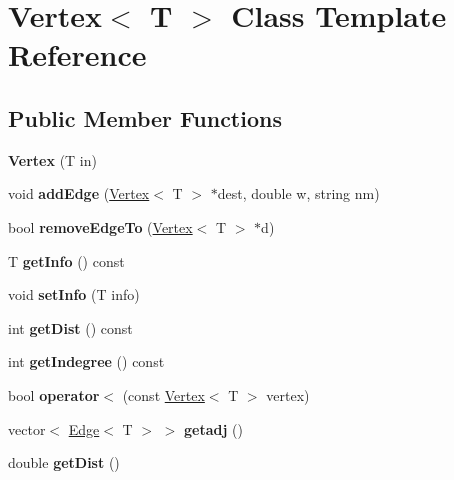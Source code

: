 \hypertarget{class_vertex}{}\section{Vertex$<$ T $>$ Class Template Reference}
\label{class_vertex}
\subsection*{Public Member Functions}
\begin{DoxyCompactItemize}
\item 
\hypertarget{class_vertex_afcbdd4d4198b672356559cb8fa088408}{}\label{class_vertex_afcbdd4d4198b672356559cb8fa088408} 
{\bfseries Vertex} (T in)
\item 
\hypertarget{class_vertex_a2326b28f791a6fd84e32672d75a73ab3}{}\label{class_vertex_a2326b28f791a6fd84e32672d75a73ab3} 
void {\bfseries add\+Edge} (\hyperlink{class_vertex}{Vertex}$<$ T $>$ $\ast$dest, double w, string nm)
\item 
\hypertarget{class_vertex_ab2b5b43fb1709a901b78718436763a84}{}\label{class_vertex_ab2b5b43fb1709a901b78718436763a84} 
bool {\bfseries remove\+Edge\+To} (\hyperlink{class_vertex}{Vertex}$<$ T $>$ $\ast$d)
\item 
\hypertarget{class_vertex_a48eae2f7af2362634adab02b7b2dbec6}{}\label{class_vertex_a48eae2f7af2362634adab02b7b2dbec6} 
T {\bfseries get\+Info} () const
\item 
\hypertarget{class_vertex_a31cd60c26640f8072a928ba70eb2f95e}{}\label{class_vertex_a31cd60c26640f8072a928ba70eb2f95e} 
void {\bfseries set\+Info} (T info)
\item 
\hypertarget{class_vertex_a645a81161bc9f70ebfda8e292b91c24b}{}\label{class_vertex_a645a81161bc9f70ebfda8e292b91c24b} 
int {\bfseries get\+Dist} () const
\item 
\hypertarget{class_vertex_ac78980191ea1f9d22e6617e9e511b755}{}\label{class_vertex_ac78980191ea1f9d22e6617e9e511b755} 
int {\bfseries get\+Indegree} () const
\item 
\hypertarget{class_vertex_a7091b26f281a5041b1775a3d3f9cb7a6}{}\label{class_vertex_a7091b26f281a5041b1775a3d3f9cb7a6} 
bool {\bfseries operator$<$} (const \hyperlink{class_vertex}{Vertex}$<$ T $>$ vertex)
\item 
\hypertarget{class_vertex_a0345efdd03a11cfff112cb00b0ff38e8}{}\label{class_vertex_a0345efdd03a11cfff112cb00b0ff38e8} 
vector$<$ \hyperlink{class_edge}{Edge}$<$ T $>$ $>$ {\bfseries getadj} ()
\item 
\hypertarget{class_vertex_a2d06d0997dd56735bad8baa45f45d3a0}{}\label{class_vertex_a2d06d0997dd56735bad8baa45f45d3a0} 
double {\bfseries get\+Dist} ()
\end{DoxyCompactItemize}
